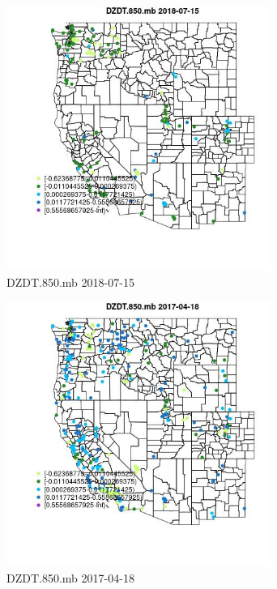 \begin{figure} 
\centering  
\includegraphics[width=0.77\textwidth]{Code_Outputs/Report_ML_input_PM25_Step4_part_e_de_duplicated_aves_compiled_2019-05-20wNAs_MapObsDZDT850mb2018-07-15.jpg} 
\caption{\label{fig:Report_ML_input_PM25_Step4_part_e_de_duplicated_aves_compiled_2019-05-20wNAsMapObsDZDT850mb2018-07-15}DZDT.850.mb 2018-07-15} 
\end{figure} 
 

\begin{figure} 
\centering  
\includegraphics[width=0.77\textwidth]{Code_Outputs/Report_ML_input_PM25_Step4_part_e_de_duplicated_aves_compiled_2019-05-20wNAs_MapObsDZDT850mb2017-04-18.jpg} 
\caption{\label{fig:Report_ML_input_PM25_Step4_part_e_de_duplicated_aves_compiled_2019-05-20wNAsMapObsDZDT850mb2017-04-18}DZDT.850.mb 2017-04-18} 
\end{figure} 
 

